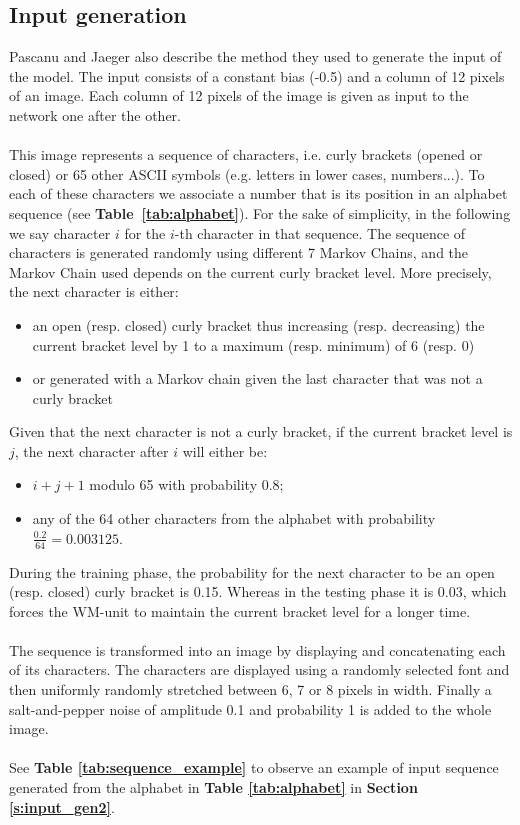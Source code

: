 \subsection{Input generation}

Pascanu and Jaeger also describe the method they used to generate the input of the model.
The input consists of a constant bias (-0.5) and a column of 12 pixels of an image.
Each column of 12 pixels of the image is given as input to the network one after the other. \\
\\
This image represents a sequence of characters, i.e. curly brackets (opened or closed) or 65 other ASCII symbols (e.g. letters in lower cases, numbers...).
To each of these characters we associate a number that is its position in an alphabet sequence (see \textbf{Table~\ref{tab:alphabet}}).
For the sake of simplicity, in the following we say character $i$ for the $i$-th character in that sequence.
The sequence of characters is generated randomly using different 7 Markov Chains, and the Markov Chain used depends on the current curly bracket level.
More precisely, the next character is either:
\begin{itemize}
    \item an open (resp. closed) curly bracket thus increasing (resp. decreasing) the current bracket level by 1 to a maximum (resp. minimum) of 6 (resp. 0)
    \item or generated with a Markov chain given the last character that was not a curly bracket
\end{itemize}
Given that the next character is not a curly bracket, if the current bracket level is $\mathit{j}$, the next character after $\mathit{i}$ will either be:
\begin{itemize}
    \item $\mathit{i} + \mathit{j} + 1$ modulo 65 with probability $0.8$;
    \item any of the 64 other characters from the alphabet with probability $\frac{0.2}{64} = 0.003125
$.
\end{itemize}
During the training phase, the probability for the next character to be an open (resp. closed) curly bracket is 0.15.
Whereas in the testing phase it is 0.03, which forces the WM-unit to maintain the current bracket level for a longer time. \\
\\
The sequence is transformed into an image by displaying and concatenating each of its characters. 
The characters are displayed using a randomly selected font and then uniformly randomly stretched between 6, 7 or 8 pixels in width.
Finally a salt-and-pepper noise of amplitude 0.1 and probability 1 is added to the whole image.\\
\\
See \textbf{Table \ref{tab:sequence_example}} to observe an example of input sequence generated from the alphabet in \textbf{Table \ref{tab:alphabet}} in \textbf{Section \ref{s:input_gen2}}.

